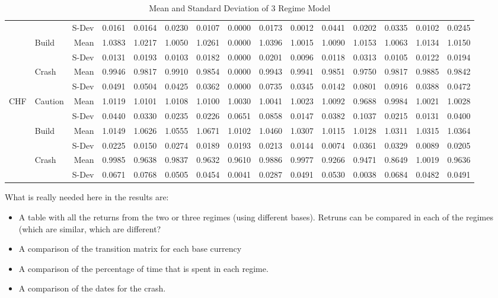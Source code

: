 \documentclass[12pt, a4paper, oneside]{article} %
\begin{document}
\begin{landscape}
\begin{table}[ht]
\begin{tabular}{llrrrrrrrrrrrrr}
  && S-Dev & 0.0161 & 0.0164 & 0.0230 & 0.0107 & 0.0000 & 0.0173 & 0.0012 & 0.0441 & 0.0202 & 0.0335 & 0.0102 & 0.0245\\ 
  & \multirow{2}{*}{Build} &  Mean & 1.0383 & 1.0217 & 1.0050 & 1.0261 & 0.0000 & 1.0396 & 1.0015 & 1.0090 & 1.0153 & 1.0063 & 1.0134 & 1.0150\\ 
  && S-Dev & 0.0131 & 0.0193 & 0.0103 & 0.0182 & 0.0000 & 0.0201 & 0.0096 & 0.0118 & 0.0313 & 0.0105 & 0.0122 & 0.0194\\ 
  & \multirow{2}{*}{Crash} & Mean & 0.9946 & 0.9817 & 0.9910 & 0.9854 & 0.0000 & 0.9943 & 0.9941 & 0.9851 & 0.9750 & 0.9817 & 0.9885 & 0.9842 \\ 
  &&S-Dev & 0.0491 & 0.0504 & 0.0425 & 0.0362 & 0.0000 & 0.0735 & 0.0345 & 0.0142 & 0.0801 & 0.0916 & 0.0388 & 0.0472\\ 
\hline
\multirow{6}{*}{CHF}& \multirow{2}{*}{Caution} & Mean & 1.0119 & 1.0101 & 1.0108 & 1.0100 & 1.0030 & 1.0041 & 1.0023 & 1.0092 & 0.9688 & 0.9984 & 1.0021 & 1.0028\\ 
  && S-Dev& 0.0440 & 0.0330 & 0.0235 & 0.0226 & 0.0651 & 0.0858 & 0.0147 & 0.0382 & 0.1037 & 0.0215 & 0.0131 & 0.0400\\ 
  & \multirow{2}{*}{Build} & Mean & 1.0149 & 1.0626 & 1.0555 & 1.0671 & 1.0102 & 1.0460 & 1.0307 & 1.0115 & 1.0128 & 1.0311 & 1.0315 & 1.0364\\ 
  && S-Dev & 0.0225 & 0.0150 & 0.0274 & 0.0189 & 0.0193 & 0.0213 & 0.0144 & 0.0074 & 0.0361 & 0.0329 & 0.0089 & 0.0205\\ 
  & \multirow{2}{*}{Crash} & Mean & 0.9985 & 0.9638 & 0.9837 & 0.9632 & 0.9610 & 0.9886 & 0.9977 & 0.9266 & 0.9471 & 0.8649 & 1.0019 & 0.9636 \\ 
  && S-Dev& 0.0671 & 0.0768 & 0.0505 & 0.0454 & 0.0041 & 0.0287 & 0.0491 & 0.0530 & 0.0038 & 0.0684 & 0.0482 & 0.0491\\ 
   \hline
\end{tabular}
\caption{Mean and Standard Deviation of 3 Regime Model}
\label{tabref:3StateProb}
\end{table}
\end{landscape}

What is really needed here in the results are:
\begin{itemize}
\item A table with all the returns from the two or three regimes (using different bases).  Retruns can be compared in each of the regimes (which are similar, which are different? 
\item A comparison of the transition matrix for each base currency
\item A comparison of the percentage of time that is spent in each regime. 
\item A comparison of the dates for the crash. 
\end{itemize}
 
\end{document}

